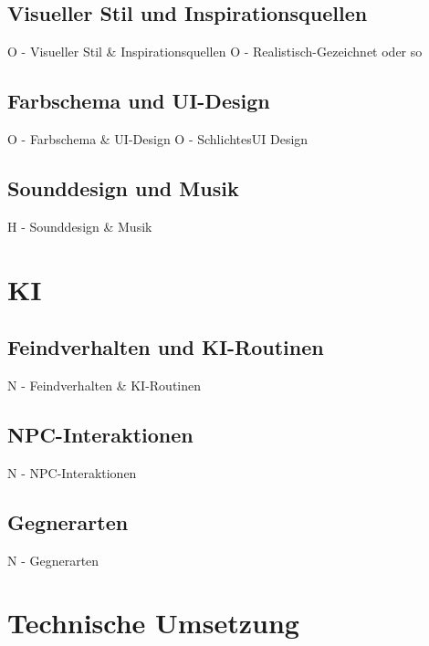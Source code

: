 \documentclass[oneside]{ausarbeitung}
\begin{document}
\section{Visueller Stil und Inspirationsquellen}

O - Visueller Stil & Inspirationsquellen
O   - Realistisch-Gezeichnet oder so


\section{Farbschema und UI-Design}

O - Farbschema & UI-Design
O   - SchlichtesUI Design


\section{Sounddesign und Musik}

H - Sounddesign & Musik


\chapter{KI}

\section{Feindverhalten und KI-Routinen}

N - Feindverhalten & KI-Routinen


\section{NPC-Interaktionen}

N - NPC-Interaktionen


\section{Gegnerarten}

N - Gegnerarten


\chapter{Technische Umsetzung}
\end{document}

